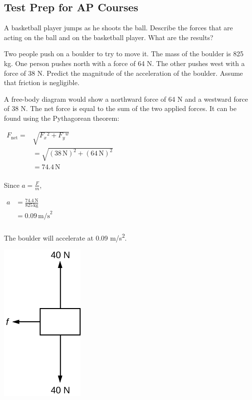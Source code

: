 \documentclass[
]{book}
\newenvironment{ap-test-prep}{}{}
\begin{document}
\hypertarget{fs-id1925843}{}
\begin{ap-test-prep}

\hypertarget{test-prep-for-ap-courses-13}{%
\subsection{Test Prep for AP Courses}\label{test-prep-for-ap-courses-13}}

\hypertarget{fs-id1471760}{}
\leavevmode\hypertarget{fs-id1910401}{}%
A basketball player jumps as he shoots the ball. Describe the forces
that are acting on the ball and on the basketball player. What are the
results?

\hypertarget{fs-id1669265}{}
\leavevmode\hypertarget{fs-id1797000}{}%
Two people push on a boulder to try to move it. The mass of the boulder
is 825 kg. One person pushes north with a force of 64 N. The other
pushes west with a force of 38 N. Predict the magnitude of the
acceleration of the boulder. Assume that friction is negligible.

\leavevmode\hypertarget{fs-id1481814}{}%
A free-body diagram would show a northward force of 64 N and a westward
force of 38 N. The net force is equal to the sum of the two applied
forces. It can be found using the Pythagorean theorem:

\(\begin{matrix} {F_{\text{net}} =} & \sqrt{F_{x}{}^{2} + F_{y}{}^{w}} \\  & {= \sqrt{{(38\,\text{N})}^{2} + {(64\,\text{N})}^{2}}} \\  & {= 74.4\,\text{N}} \\ \end{matrix}\)

Since \(a = \frac{F}{m}\),

\(\begin{matrix} a & {= \frac{74.4\,\text{N}}{825\,\text{kg}}} \\  & {= 0.09\,\text{m/s}^{\text{2}}} \\ \end{matrix}\)

The boulder will accelerate at 0.09 m/s\textsuperscript{2}.

\hypertarget{fs-id1046422}{}
\leavevmode\hypertarget{fs-id881529}{}%
\includegraphics{images/Figure_04_07_09.jpg}


\end{ap-test-prep}
\end{document}
